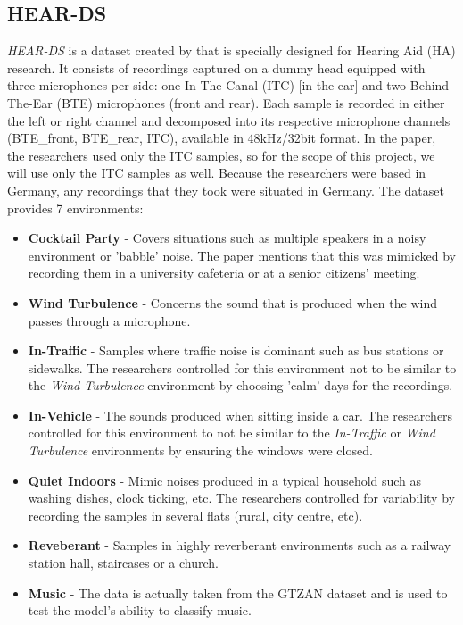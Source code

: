 \documentclass[logo,bsc,singlespacing,parskip,online]{infthesis}
\newcommand{\heards}{\textit{HEAR-DS}\xspace}
\begin{document}
\subsection{HEAR-DS}
\label{sec:hear-ds}
\heards is a dataset created by \citet{Huwel2020HearDS} that is specially designed for Hearing Aid (HA) research. 
It consists of recordings captured on a dummy head equipped with three microphones per side: one In-The-Canal (ITC) [in the ear] and two Behind-The-Ear (BTE) microphones (front and rear).
Each sample is recorded in either the left or right channel and decomposed into its respective microphone channels (BTE\_front, BTE\_rear, ITC), available in 48kHz/32bit format.
In the paper, the researchers used only the ITC samples, so for the scope of this project, we will use only the ITC samples as well. 
Because the researchers were based in Germany, any recordings that they took were situated in Germany.
The dataset provides 7 environments:
\begin{itemize}
   \item \textbf{Cocktail Party} - Covers situations such as multiple speakers in a noisy environment or 'babble' noise. The paper mentions that this was mimicked by recording them in a university cafeteria or at a senior citizens' meeting.
   \item \textbf{Wind Turbulence} - Concerns the sound that is produced when the wind passes through a microphone.
   \item \textbf{In-Traffic} - Samples where traffic noise is dominant such as bus stations or sidewalks. The researchers controlled for this environment not to be similar to the \textit{Wind Turbulence} environment by choosing 'calm' days for the recordings.
   \item \textbf{In-Vehicle} - The sounds produced when sitting inside a car. The researchers controlled for this environment to not be similar to the \textit{In-Traffic} or \textit{Wind Turbulence} environments by ensuring the windows were closed. 
   \item \textbf{Quiet Indoors} - Mimic noises produced in a typical household such as washing dishes, clock ticking, etc. The researchers controlled for variability by recording the samples in several flats (rural, city centre, etc).
   \item \textbf{Reveberant} - Samples in highly reverberant environments such as a railway station hall, staircases or a church. 
   \item \textbf{Music} - The data is actually taken from the GTZAN dataset \cite{tzanetakis_musical_2002} and is used to test the model's ability to classify music.
\end{itemize}
\end{document}
